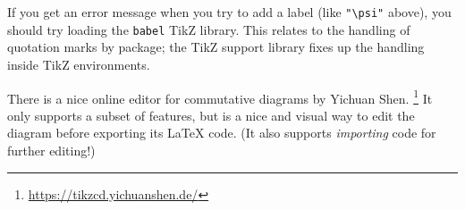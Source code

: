 \begin{gotcha}
If you get an error message when you try to add a label (like \verb|"\psi"| above),
you should try loading the \verb|babel| TikZ library.
This relates to the handling of quotation marks by  package;
the TikZ support library fixes up the handling inside TikZ environments.
\end{gotcha}

There is a nice online editor for commutative diagrams by Yichuan Shen.%
\footnote{\url{https://tikzcd.yichuanshen.de/}}
It only supports a subset of  features,
but is a nice and visual way to edit the diagram before exporting its \LaTeX{} code.
(It also supports \emph{importing} code for further editing!)
